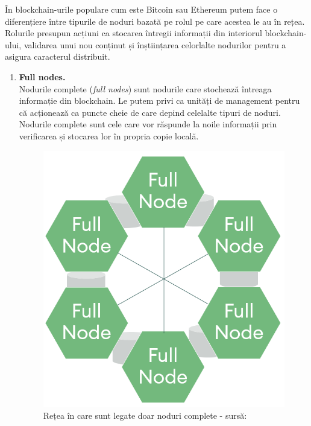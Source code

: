 În blockchain-urile populare cum este Bitcoin \cite{Bitcoin} sau Ethereum \cite{Ethereum} putem face o diferențiere între tipurile de noduri bazată pe rolul pe care acestea le au în rețea. Rolurile presupun acțiuni ca stocarea întregii informații din interiorul blockchain-ului, validarea unui nou conținut și înștiințarea celorlalte nodurilor pentru a asigura caracterul distribuit.\\

\begin{enumerate}
    \item \textbf{Full nodes.} \\
    
    Nodurile complete (\textit{full nodes}) sunt nodurile care stochează întreaga informație din blockchain. Le putem privi ca unități de management pentru că acționează ca puncte cheie de care depind celelalte tipuri de noduri.\\
    
    Nodurile complete sunt cele care vor răspunde la noile informații prin verificarea și stocarea lor în propria copie locală.\\
    
    \begin{figure}[H]
    \centering
    \includegraphics[scale=0.35]{Images/BC_FullNodes.png}
    \caption{Rețea în care sunt legate doar noduri complete - sursă: \cite{Blockchain_Node_Types}}
    \end{figure}
    

\end{enumerate}
